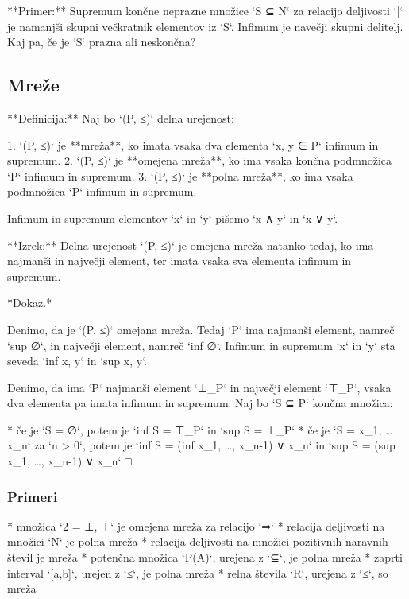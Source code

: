 **Primer:** Supremum končne neprazne množice `S ⊆ N` za relacijo deljivosti `|`
je namanjši skupni večkratnik elementov iz `S`. Infimum je navečji skupni
delitelj. Kaj pa, če je `S` prazna ali neskončna?


\subsection{Mreže}

**Definicija:** Naj bo `(P, ≤)` delna urejenost:

1. `(P, ≤)` je **mreža**, ko imata vsaka dva elementa `x, y ∈ P` infimum in supremum.
2. `(P, ≤)` je **omejena mreža**, ko ima vsaka končna podmnožica `P` infimum in supremum.
3. `(P, ≤)` je **polna mreža**, ko ima vsaka podmnožica `P` infimum in supremum.

Infimum in supremum elementov `x` in `y` pišemo `x ∧ y` in `x ∨ y`.

**Izrek:** Delna urejenost `(P, ≤)` je omejena mreža natanko tedaj, ko ima
najmanši in največji element, ter imata vsaka sva elementa infimum in supremum.

*Dokaz.*

Denimo, da je `(P, ≤)` omejana mreža. Tedaj `P` ima najmanši element, namreč
`sup ∅`, in največji element, namreč `inf ∅`. Infimum in supremum `x` in `y` sta
seveda `inf {x, y}` in `sup {x, y}`.

Denimo, da ima `P` najmanši element `⊥_P` in največji element `⊤_P`, vsaka dva
elementa pa imata infimum in supremum. Naj bo `S ⊆ P` končna množica:

* če je `S = ∅`, potem je `inf S = ⊤_P` in `sup S = ⊥_P`
* če je `S = {x_1, … x_n}` za `n > 0`, potem je `inf S = (inf {x_1, …, x_n-1}) ∨ x_n` in
  `sup S = (sup {x_1, …, x_n-1}) ∨ x_n` □

\subsubsection{Primeri}

* množica `2 = {⊥, ⊤}` je omejena mreža za relacijo `⇒`
* relacija deljivosti na množici `N` je polna mreža
* relacija deljivosti na množici pozitivnih naravnih števil je mreža
* potenčna množica `P(A)`, urejena z `⊆`, je polna mreža
* zaprti interval `[a,b]`, urejen z `≤`, je polna mreža
* relna števila `R`, urejena z `≤`, so mreža

